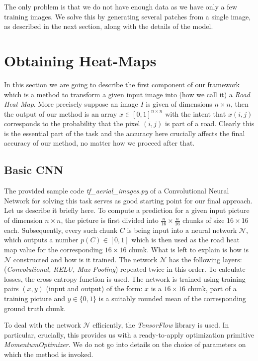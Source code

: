 \documentclass[10pt,conference,compsocconf]{IEEEtran}
\newcommand{\cN}{\mathcal{N}}
\begin{document}
The only problem is that we do not have enough data as we have only a few training images. We solve this by generating several patches from a single image, as described in the next section, along with the details of the model.




  
\section{Obtaining Heat-Maps}
In this section we are going to describe the first component of our framework which is a method to transform a given input image into (how we call it) a {\it Road Heat Map}. More precisely suppose an image $I$ is given of dimensions $n\times n$, then the output of our method is an array $x\in [0,1]^{n\times n}$ with the intent that $x(i,j)$ corresponds to the probability that the pixel $(i,j)$ is part of a road. Clearly this is the essential part of the task and the accuracy here crucially affects the final accuracy of our method, no matter how we proceed after that. 

\subsection{Basic CNN}
The provided sample code {\it tf\_aerial\_images.py} of a Convolutional Neural Network for solving this task serves as good starting point for our final approach. Let us describe it briefly here. To compute a prediction for a given input picture of dimension $n\times n$, the picture is first divided into $\frac{n}{16} \times \frac{n}{16}$ chunks of size $16 \times 16$ each. Subsequently, every such chunk $C$ is being input into a neural network $\cN$, which outputs a number $p(C) \in [0,1]$ which is then used as the road heat map value for the corresponding $16\times 16$ chunk. What is left to explain is how is $\cN$ constructed and how is it trained. The network $\cN$ has the following layers: (\textit{Convolutional, RELU, Max Pooling}) repeated twice in this order. To calculate  losses, the cross entropy function is used. The network  is trained using training pairs $(x,y)$ (input and output) of the form: $x$ is a $16\times 16$ chunk, part of a training picture and $y \in \{0,1\}$ is a suitably rounded mean of the corresponding ground truth chunk.  

To deal with the network $\cN$ efficiently, the {\it TensorFlow} library is used. In particular, crucially, this provides us with a ready-to-apply optimization primitive {\it MomentumOptimizer}. We do not go into details on the choice of parameters on which the method is invoked.
\end{document}
